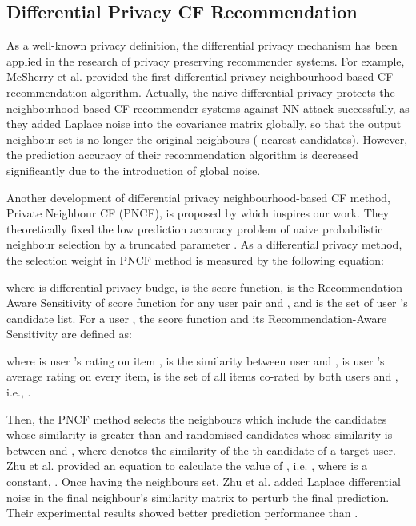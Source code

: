 \documentclass[11pt]{article}
\begin{document}
\subsection{Differential Privacy CF Recommendation}
As a well-known privacy definition, the differential privacy mechanism \cite{DWORK2006} has been applied in the research of privacy preserving recommender systems. For example, McSherry et al. \cite{MCSHERRY2009} provided the first differential privacy neighbourhood-based CF recommendation algorithm. Actually, the naive differential privacy protects the neighbourhood-based CF recommender systems against NN attack successfully, as they added Laplace noise into the covariance matrix globally, so that the output neighbour set is no longer the original  neighbours ( nearest candidates). However, the prediction accuracy of their recommendation algorithm is decreased significantly due to the introduction of global noise.

Another development of differential privacy neighbourhood-based CF method, Private Neighbour CF (PNCF), is proposed by \cite{ZHU2014} which inspires our work. They theoretically fixed the low prediction accuracy problem of naive probabilistic neighbour selection \cite{ADAMOPOULOS2014} by a truncated parameter . As a differential privacy method, the selection weight in PNCF method is measured by the following equation:

where  is differential privacy budge,  is the score function,  is the Recommendation-Aware Sensitivity of score function  for any user pair  and , and  is the set of user 's candidate list. For a user , the score function  and its Recommendation-Aware Sensitivity are defined as:


where  is user 's rating on item ,  is the similarity between user  and ,  is user 's average rating on every item,  is the set of all items co-rated by both users  and
, i.e., .

Then, the PNCF method selects the  neighbours which include the candidates whose similarity is greater than  and randomised candidates whose similarity is between  and , where  denotes the similarity of the th candidate of a target user. Zhu et al. \cite{ZHU2014} provided an equation to calculate the value of , i.e. , where  is a constant, . Once having the  neighbours set, Zhu et al. \cite{ZHU2014} added Laplace differential noise in the final  neighbour's similarity matrix to perturb the final prediction. Their experimental results showed better prediction performance than \cite{MCSHERRY2009}.
\end{document}
